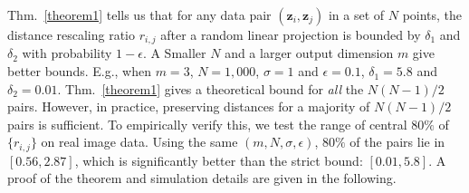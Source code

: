 \documentclass{article} \usepackage{iclr2021_conference,times}
\begin{document}
Thm.~\ref{theorem1} tells us that for any data pair $(\mathbf{z}_i, \mathbf{z}_j)$ in a set of $N$ points, the distance rescaling ratio $r_{i,j}$ after a random linear projection is bounded by $\delta_1$ and $\delta_2$ with probability  $1 -\epsilon$. A Smaller $N$ and a larger output dimension $m$ give better bounds. E.g., when $m=3$, $N=1,000$, $\sigma=1$ and $\epsilon=0.1$, $\delta_1 = 5.8$ and $\delta_2 = 0.01$. Thm.~\ref{theorem1} gives a theoretical bound for \emph{all} the $N(N-1)/2$ pairs. However, in practice, preserving distances for a majority of $N(N-1)/2$ pairs is sufficient. To empirically verify this, we test
the range of central $80\%$ of $\{r_{i,j}\}$ on real image data. Using the same $(m,N,\sigma,\epsilon)$, $80\%$ of the pairs lie in 
$[0.56,2.87]$, which is significantly better than the strict bound: $[0.01,5.8]$. A proof of the theorem and simulation details are given in the following.
\end{document}
